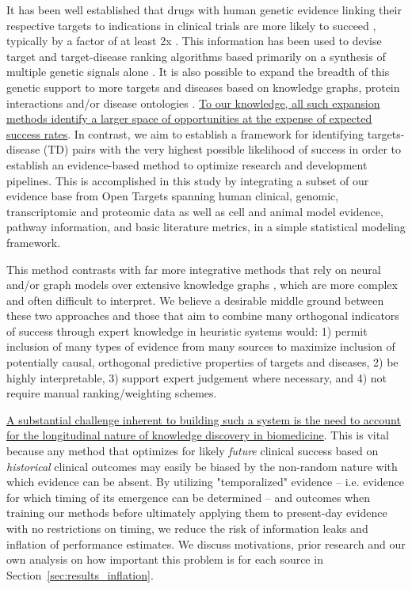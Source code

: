 \documentclass{article}
\begin{document}
It has been well established that drugs with human genetic evidence linking their respective targets to indications in clinical trials are more likely to succeed \cite{PMID:24833294,PMID:35804044,Razuvayevskaya2023.02.07.23285407,PMID:37803084,PMID:36963162}, typically by a factor of at least 2x \cite{Minikel2023.06.23.23291765,Nelson2015-eg,King2019-rc,PMID:30652614,Sadler2023-xd}. This information has been used to devise target and target-disease ranking algorithms based primarily on a synthesis of multiple genetic signals alone \cite{PMID:38172303,Koscielny2017-rr,PMID:31253980}. It is also possible to expand the breadth of this genetic support to more targets and diseases based on knowledge graphs, protein interactions and/or disease ontologies \cite{PMID:33262371,Bao2022-bq,Sadler2023-xd,PMID:36087372,PMID:36823319}. \ul{To our knowledge, all such expansion methods identify a larger space of opportunities at the expense of expected success rates}. In contrast, we aim to establish a framework for identifying targets-disease (TD) pairs with the very highest possible likelihood of success in order to establish an evidence-based method to optimize research and development pipelines. This is accomplished in this study by integrating a subset of our evidence base from Open Targets \cite{Koscielny2017-rr} spanning human clinical, genomic, transcriptomic and proteomic data as well as cell and animal model evidence, pathway information, and basic literature metrics, in a simple statistical modeling framework. 

This method contrasts with far more integrative methods that rely on neural and/or graph models over extensive knowledge graphs \cite{Paliwal2020-hr,PMID:33741907,pittala2020relationweighted,PMID:32750869}, which are more complex and often difficult to interpret. We believe a desirable middle ground between these two approaches and those that aim to combine many orthogonal indicators of success through expert knowledge in heuristic systems \cite{PMID:38404138,Koscielny2017-rr} would: 1) permit inclusion of many types of evidence from many sources to maximize inclusion of potentially causal, orthogonal predictive properties of targets and diseases, 2) be highly interpretable, 3) support expert judgement where necessary, and 4) not require manual ranking/weighting schemes. 

\ul{A substantial challenge inherent to building such a system is the need to account for the longitudinal nature of knowledge discovery in biomedicine}. This is vital because any method that optimizes for likely \textit{future} clinical success based on \textit{historical} clinical outcomes may easily be biased by the non-random nature with which evidence can be absent. By utilizing "temporalized" evidence -- i.e. evidence for which timing of its emergence can be determined -- and outcomes when training our methods before ultimately applying them to present-day evidence with no restrictions on timing, we reduce the risk of information leaks and inflation of performance estimates. We discuss motivations, prior research and our own analysis on how important this problem is for each source in Section~\ref{sec:results_inflation}.
\end{document}
